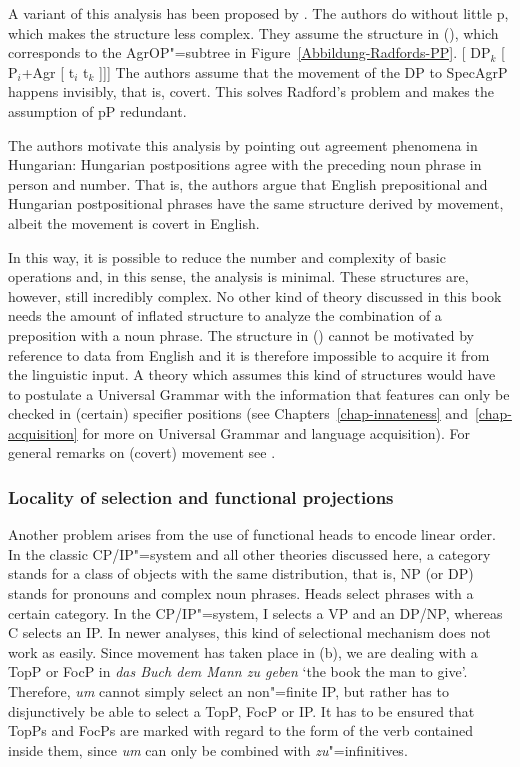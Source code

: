 A variant of this analysis has been proposed by \citet*[]{HNG2005a}. The authors do without little p, which makes the structure
less complex. They assume the structure in (), which corresponds to the AgrOP"=subtree in Figure~\ref{Abbildung-Radfords-PP}.
\ea
{}[ DP$_k$ [ P$_i$+Agr [ t$_i$ t$_k$ ]]]
\z
The authors assume that the movement of the DP to SpecAgrP happens invisibly, that is,
covert. This solves Radford's problem and makes the assumption of pP redundant. 

The authors motivate this analysis by pointing out agreement phenomena in Hungarian: Hungarian
postpositions agree with the preceding noun phrase in person and number. That is, the authors argue that English prepositional
and Hungarian postpositional phrases have the same structure derived by movement, albeit the
movement is covert in English.

In this way, it is possible to reduce the number and complexity of basic operations and, in this sense, the analysis is minimal. These structures
are, however, still incredibly complex. No other kind of theory discussed in this book needs the amount of inflated structure to analyze the combination
of a preposition with a noun phrase. The structure in () cannot be motivated by reference to
data from English and it is therefore impossible to acquire it from the linguistic input. A theory
which assumes this kind of structures would have to postulate a Universal Grammar with
the information that features can only be checked in (certain) specifier positions (see Chapters~\ref{chap-innateness} 
and~\ref{chap-acquisition} for more on Universal Grammar and language acquisition). For general
remarks on (covert) movement see .

\subsubsection{Locality of selection and functional projections}

Another problem arises from the use of functional heads to encode linear order. In the classic
CP/IP"=system and all other theories discussed here, a category stands for a class of objects with
the same distribution, that is, NP (or DP) stands for pronouns and complex noun phrases. Heads
select phrases with a certain category. In the CP/IP"=system, I selects a VP and an DP/NP, whereas C
selects an IP. In newer analyses, this kind of selectional mechanism does not work as easily. Since
movement has taken place in (b), we are dealing with a TopP or FocP in \emph{das Buch dem
  Mann zu geben} `the book the man to give'.  Therefore, \emph{um} cannot simply select an
non"=finite IP, but rather has to disjunctively be able to select a TopP, FocP or IP. It has to be
ensured that TopPs and FocPs are marked with regard to the form of the verb contained inside them,
since \emph{um} can only be combined with \emph{zu}"=infinitives.

